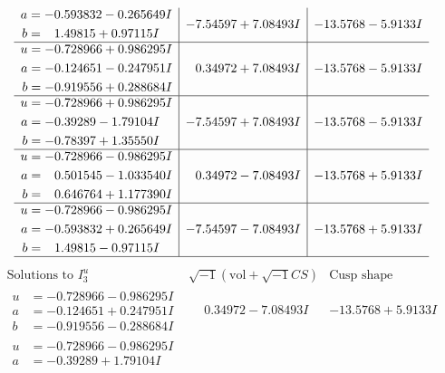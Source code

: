 \documentclass[1p]{elsarticle_modified}
\theoremstyle{definition}
\newcommand{\I}{\sqrt{-1}}
\begin{document}
$$\begin{array}{c|c|c}
\begin{aligned}
a &= -0.593832 - 0.265649 I \\
b &= \phantom{-}1.49815 + 0.97115 I\end{aligned}
 & -7.54597 + 7.08493 I & -13.5768 - 5.9133 I \\ \hline\begin{aligned}
u &= -0.728966 + 0.986295 I \\
a &= -0.124651 - 0.247951 I \\
b &= -0.919556 + 0.288684 I\end{aligned}
 & \phantom{-}0.34972 + 7.08493 I & -13.5768 - 5.9133 I \\ \hline\begin{aligned}
u &= -0.728966 + 0.986295 I \\
a &= -0.39289 - 1.79104 I \\
b &= -0.78397 + 1.35550 I\end{aligned}
 & -7.54597 + 7.08493 I & -13.5768 - 5.9133 I \\ \hline\begin{aligned}
u &= -0.728966 - 0.986295 I \\
a &= \phantom{-}0.501545 - 1.033540 I \\
b &= \phantom{-}0.646764 + 1.177390 I\end{aligned}
 & \phantom{-}0.34972 - 7.08493 I & -13.5768 + 5.9133 I \\ \hline\begin{aligned}
u &= -0.728966 - 0.986295 I \\
a &= -0.593832 + 0.265649 I \\
b &= \phantom{-}1.49815 - 0.97115 I\end{aligned}
 & -7.54597 - 7.08493 I & -13.5768 + 5.9133 I\\
 \hline 
 \end{array}$$\newpage$$\begin{array}{c|c|c}  
\text{Solutions to }I^u_{3}& \I (\text{vol} + \sqrt{-1}CS) & \text{Cusp shape}\\
 \hline 
\begin{aligned}
u &= -0.728966 - 0.986295 I \\
a &= -0.124651 + 0.247951 I \\
b &= -0.919556 - 0.288684 I\end{aligned}
 & \phantom{-}0.34972 - 7.08493 I & -13.5768 + 5.9133 I \\ \hline\begin{aligned}
u &= -0.728966 - 0.986295 I \\
a &= -0.39289 + 1.79104 I \\

\end{aligned}
\end{array}$$
\end{document}
